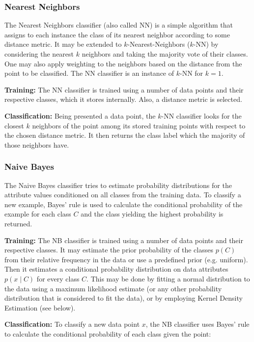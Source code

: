 \documentclass[
	ruledheaders=chapter,
	class=report,
	thesis={type=master, department=inf},
	accentcolor=1c,
	custommargins=true,
	marginpar=false,
	parskip=half-,
	fontsize=11pt,
]{tudapub}
\begin{document}
	\subsubsection{Nearest Neighbors}
	\label{ml:nn}
	
	The Nearest Neighbors classifier (also called NN) is a simple algorithm that assigns to each instance the class of its nearest neighbor according to some distance metric. It may be extended to $k$-Nearest-Neighbors ($k$-NN) by considering the nearest $k$ neighbors and taking the majority vote of their classes. One may also apply weighting to the neighbors based on the distance from the point to be classified. The NN classifier is an instance of $k$-NN for $k = 1$.
	
	\textbf{Training:} The NN classifier is trained using a number of data points and their respective classes, which it stores internally. Also, a distance metric is selected.
	
	\textbf{Classification:} Being presented a data point, the $k$-NN classifier looks for the closest $k$ neighbors of the point among its stored training points with respect to the chosen distance metric. It then returns the class label which the majority of those neighbors have.
		
	\subsubsection{Naive Bayes} 
	
	The Naive Bayes classifier tries to estimate probability distributions for the attribute values conditioned on all classes from the training data. To classify a new example, Bayes' rule is used to calculate the conditional probability of the example for each class $C$ and the class yielding the highest probability is returned.
	
	\textbf{Training:} The NB classifier is trained using a number of data points and their respective classes. It may estimate the prior probability of the classes $p(C)$ from their relative frequency in the data or use a predefined prior (e.g. uniform). Then it estimates a conditional probability distribution on data attributes $p(x \mid C)$ for every class $C$. This may be done by fitting a normal distribution to the data using a maximum likelihood estimate (or any other probability distribution that is considered to fit the data), or by employing Kernel Density Estimation (see below). 
	
	\textbf{Classification:} To classify a new data point $x$, the NB classifier uses Bayes' rule to calculate the conditional probability of each class given the point:
	
\end{document}
